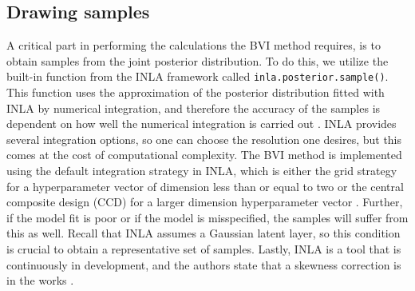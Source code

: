 \subsection{Drawing samples}
A critical part in performing the calculations the BVI method requires, is to obtain samples from the joint posterior distribution. To do this, we utilize the built-in function from the INLA framework called \texttt{inla.posterior.sample()}. This function uses the approximation of the posterior distribution fitted with INLA by numerical integration, and therefore the accuracy of the samples is dependent on how well the numerical integration is carried out \citep{gomezrubio2020inla}. INLA provides several integration options, so one can choose the resolution one desires, but this comes at the cost of computational complexity. The BVI method is implemented using the default integration strategy in INLA, which is either the grid strategy for a hyperparameter vector of dimension less than or equal to two or the central composite design (CCD) for a larger dimension hyperparameter vector \citep{martino2019inla}. Further, if the model fit is poor or if the model is misspecified, the samples will suffer from this as well. Recall that INLA assumes a Gaussian latent layer, so this condition is crucial to obtain a representative set of samples. Lastly, INLA is a tool that is continuously in development, and the authors state that a skewness correction is in the works \citep{gomezrubio2020inla}.

